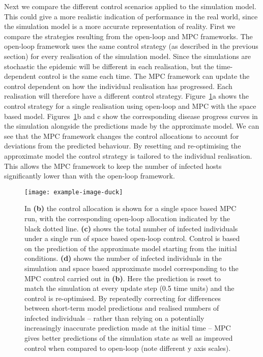 Next we compare the different control scenarios applied to the simulation model. This could give a more realistic indication of performance in the real world, since the simulation model is a more accurate representation of reality. First we compare the strategies resulting from the open-loop and MPC frameworks. The open-loop framework uses the same control strategy (as described in the previous section) for every realisation of the simulation model. Since the simulations are stochastic the epidemic will be different in each realisation, but the time-dependent control is the same each time. The MPC framework can update the control dependent on how the individual realisation has progressed. Each realisation will therefore have a different control strategy. Figure~\ref{fig:ch4:ol_mpc_comparison}a shows the control strategy for a single realisation using open-loop and MPC with the space based model. Figures~\ref{fig:ch4:ol_mpc_comparison}b and c show the corresponding disease progress curves in the simulation alongside the predictions made by the approximate model. We can see that the MPC framework changes the control allocations to account for deviations from the predicted behaviour. By resetting and re-optimising the approximate model the control strategy is tailored to the individual realisation. This allows the MPC framework to keep the number of infected hosts significantly lower than with the open-loop framework.

\begin{figure}[h]
    \begin{center}
        \texttt{[image: example-image-duck]}
        \caption{In \textbf{(b)} the control allocation is shown for a single space based MPC run, with the corresponding open-loop allocation indicated by the black dotted line. \textbf{(c)} shows the total number of infected individuals under a single run of space based open-loop control. Control is based on the prediction of the approximate model starting from the initial conditions. \textbf{(d)} shows the number of infected individuals in the simulation and space based approximate model corresponding to the MPC control carried out in \textbf{(b)}. Here the prediction is reset to match the simulation at every update step (0.5 time units) and the control is re-optimised. By repeatedly correcting for differences between short-term model predictions and realised numbers of infected individuals -- rather than relying on a potentially increasingly inaccurate prediction made at the initial time -- MPC gives better predictions of the simulation state as well as improved control when compared to open-loop (note different y axis scales).}
        \label{fig:ch4:ol_mpc_comparison}
    \end{center}
\end{figure}

